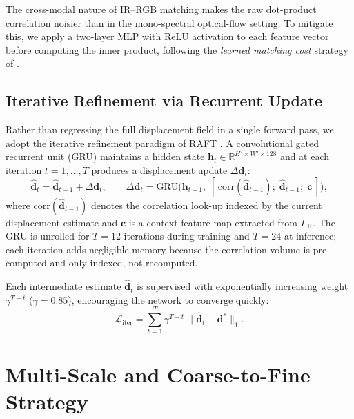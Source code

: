 The cross-modal nature of IR--RGB matching makes the raw dot-product
correlation noisier than in the mono-spectral optical-flow setting.  To
mitigate this, we apply a two-layer MLP with ReLU activation to each
feature vector before computing the inner product, following the
\emph{learned matching cost} strategy of \cite{xu2017accurate}.

\subsection{Iterative Refinement via Recurrent Update}
\label{subsec:iterative_refinement}

Rather than regressing the full displacement field in a single forward
pass, we adopt the iterative refinement paradigm of RAFT
\cite{teed2020raft}.  A convolutional gated recurrent unit (GRU)
maintains a hidden state $\mathbf{h}_t \in \mathbb{R}^{H' \times W'
\times 128}$ and at each iteration $t = 1, \ldots, T$ produces a
displacement update $\Delta \mathbf{d}_t$:
\begin{equation}
  \hat{\mathbf{d}}_{t} = \hat{\mathbf{d}}_{t-1} + \Delta \mathbf{d}_{t},
  \qquad
  \Delta \mathbf{d}_{t} = \text{GRU}\!\bigl(
    \mathbf{h}_{t-1},\;
    [\,\text{corr}(\hat{\mathbf{d}}_{t-1});\;
     \hat{\mathbf{d}}_{t-1};\;
     \mathbf{c}\,]
  \bigr),
  \label{eq:gru_update}
\end{equation}
where $\text{corr}(\hat{\mathbf{d}}_{t-1})$ denotes the correlation
look-up indexed by the current displacement estimate and $\mathbf{c}$
is a context feature map extracted from $I_{\mathrm{IR}}$.  The GRU is
unrolled for $T{=}12$ iterations during training and $T{=}24$ at
inference; each iteration adds negligible memory because the correlation
volume is pre-computed and only indexed, not recomputed.

Each intermediate estimate $\hat{\mathbf{d}}_t$ is supervised with
exponentially increasing weight $\gamma^{T-t}$ ($\gamma = 0.85$),
encouraging the network to converge quickly:
\begin{equation}
  \mathcal{L}_{\text{iter}}
    = \sum_{t=1}^{T} \gamma^{T-t}\,
      \|\hat{\mathbf{d}}_t - \mathbf{d}^{\ast}\|_1.
  \label{eq:iter_loss}
\end{equation}

\section{Multi-Scale and Coarse-to-Fine Strategy}
\label{sec:multiscale}

